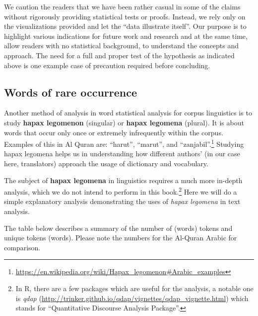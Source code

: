 \documentclass[
]{article}
\begin{document}
We caution the readers that we have been rather casual in some of the claims without rigorously providing statistical tests or proofs. Instead, we rely only on the visualizations provided and let the ``data illustrate itself''. Our purpose is to highlight various indications for future work and research and at the same time, allow readers with no statistical background, to understand the concepts and approach. The need for a full and proper test of the hypothesis as indicated above is one example case of precaution required before concluding.

\hypertarget{words-of-rare-occurrence}{%
\subsection{Words of rare occurrence}\label{words-of-rare-occurrence}}

Another method of analysis in word statistical analysis for corpus linguistics is to study \textbf{hapax legomenon} (singular) or \textbf{hapax legomena} (plural). It is about words that occur only once or extremely infrequently within the corpus. Examples of this in Al Quran are: ``harut'', ``marut'', and ``zanjabil''.\footnote{\url{https://en.wikipedia.org/wiki/Hapax_legomenon\#Arabic_examples}} Studying hapax legomena helps us in understanding how different authors' (in our case here, translators) approach the usage of dictionary and vocabulary.

The subject of \textbf{hapax legomena} in linguistics requires a much more in-depth analysis, which we do not intend to perform in this book.\footnote{In R, there are a few packages which are useful for the analysis, a notable one is \emph{qdap} (\url{http://trinker.github.io/qdap/vignettes/qdap_vignette.html}) which stands for ``Quantitative Discourse Analysis Package''.} Here we will do a simple explanatory analysis demonstrating the uses of \emph{hapax legomena} in text analysis.

The table below describes a summary of the number of (words) tokens and unique tokens (words). Please note the numbers for the Al-Quran Arabic for comparison.
\end{document}
